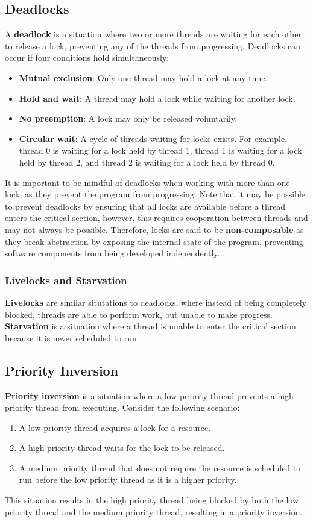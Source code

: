 \documentclass{article}
\begin{document}
\subsection{Deadlocks}
A \textbf{deadlock} is a situation where two or more threads are
waiting for each other to release a lock, preventing any of the threads
from progressing. Deadlocks can occur if four conditions hold
simultaneously:
\begin{itemize}
    \item \textbf{Mutual exclusion}: Only one thread may hold a lock at
          any time.
    \item \textbf{Hold and wait}: A thread may hold a lock while waiting
          for another lock.
    \item \textbf{No preemption}: A lock may only be released voluntarily.
    \item \textbf{Circular wait}: A cycle of threads waiting for locks
          exists. For example, thread 0 is waiting for a lock held by
          thread 1, thread 1 is waiting for a lock held by thread 2, and
          thread 2 is waiting for a lock held by thread 0.
\end{itemize}
It is important to be mindful of deadlocks when working with more than
one lock, as they prevent the program from progressing. Note that it may
be possible to prevent deadlocks by ensuring that all locks are available
before a thread enters the critical section, however, this requires
cooperation between threads and may not always be possible. Therefore,
locks are said to be \textbf{non-composable} as they break abstraction
by exposing the internal state of the program, preventing software
components from being developed independently.
\subsubsection{Livelocks and Starvation}
\textbf{Livelocks} are similar situtations to deadlocks, where instead
of being completely blocked, threads are able to perform work, but
unable to make progress. \textbf{Starvation} is a situation where a
thread is unable to enter the critical section because it is never
scheduled to run.
\subsection{Priority Inversion}
\textbf{Priority inversion} is a situation where a low-priority thread
prevents a high-priority thread from executing. Consider the following
scenario:
\begin{enumerate}
    \item A low priority thread acquires a lock for a resource.
    \item A high priority thread waits for the lock to be released.
    \item A medium priority thread that does not require the resource is
          scheduled to run before the low priority thread as it is a
          higher priority.
\end{enumerate}
This situation results in the high priority thread being blocked by both
the low priority thread and the medium priority thread, resulting in a
priority inversion.
\end{document}
